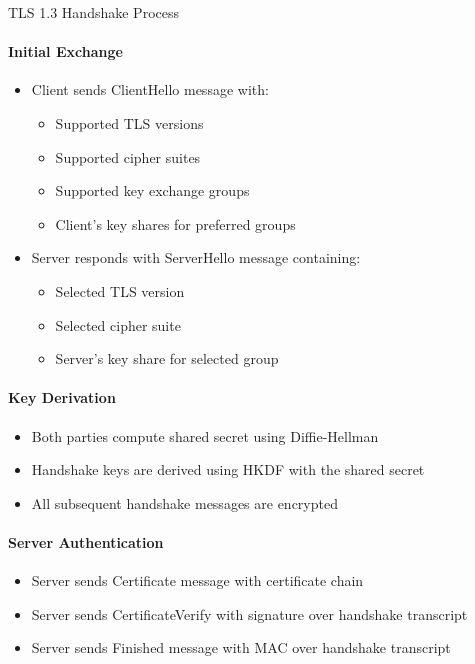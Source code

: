 \begin{KR}{TLS 1.3 Handshake Process}\\
\paragraph{Initial Exchange}
\begin{itemize}
    \item Client sends ClientHello message with:
    \begin{itemize}
        \item Supported TLS versions
        \item Supported cipher suites
        \item Supported key exchange groups
        \item Client's key shares for preferred groups
    \end{itemize}
    \item Server responds with ServerHello message containing:
    \begin{itemize}
        \item Selected TLS version
        \item Selected cipher suite
        \item Server's key share for selected group
    \end{itemize}
\end{itemize}

\paragraph{Key Derivation}
\begin{itemize}
    \item Both parties compute shared secret using Diffie-Hellman
    \item Handshake keys are derived using HKDF with the shared secret
    \item All subsequent handshake messages are encrypted
\end{itemize}

\paragraph{Server Authentication}
\begin{itemize}
    \item Server sends Certificate message with certificate chain
    \item Server sends CertificateVerify with signature over handshake transcript
    \item Server sends Finished message with MAC over handshake transcript
\end{itemize}


\end{KR}
